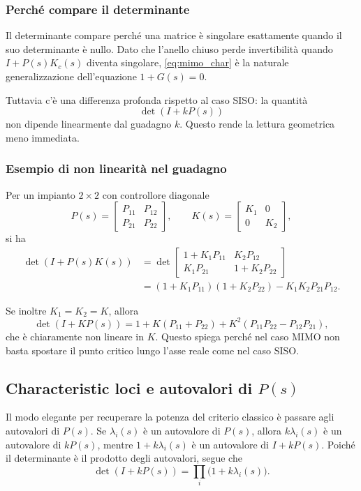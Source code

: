 \documentclass[11pt,a4paper]{article}
\begin{document}
\subsubsection{Perché compare il determinante}

Il determinante compare perché una matrice è singolare esattamente quando il suo determinante è nullo. Dato che l’anello chiuso perde invertibilità quando $I+P(s)K_c(s)$ diventa singolare, \eqref{eq:mimo_char} è la naturale generalizzazione dell’equazione $1+G(s)=0$.

Tuttavia c’è una differenza profonda rispetto al caso SISO: la quantità
$$
\det(I+kP(s))
$$
non dipende linearmente dal guadagno $k$. Questo rende la lettura geometrica meno immediata.

\subsubsection{Esempio di non linearità nel guadagno}

Per un impianto $2\times 2$ con controllore diagonale
$$
P(s)=\begin{bmatrix}P_{11} & P_{12}\\ P_{21} & P_{22}\end{bmatrix},
\qquad
K(s)=\begin{bmatrix}K_1 & 0\\ 0 & K_2\end{bmatrix},
$$
si ha
\begin{align*}
\det(I+P(s)K(s))
&=\det\begin{bmatrix}1+K_1P_{11} & K_2P_{12}\\ K_1P_{21} & 1+K_2P_{22}\end{bmatrix} \\
&=(1+K_1P_{11})(1+K_2P_{22})-K_1K_2P_{21}P_{12}.
\end{align*}

Se inoltre $K_1=K_2=K$, allora
$$
\det(I+KP(s)) = 1 + K(P_{11}+P_{22}) + K^2(P_{11}P_{22}-P_{12}P_{21}),
$$
che è chiaramente non lineare in $K$. Questo spiega perché nel caso MIMO non basta spostare il punto critico lungo l’asse reale come nel caso SISO.

\subsection{Characteristic loci e autovalori di \texorpdfstring{$P(s)$}{P(s)}}

Il modo elegante per recuperare la potenza del criterio classico è passare agli autovalori di $P(s)$. Se $\lambda_i(s)$ è un autovalore di $P(s)$, allora $k\lambda_i(s)$ è un autovalore di $kP(s)$, mentre $1+k\lambda_i(s)$ è un autovalore di $I+kP(s)$. Poiché il determinante è il prodotto degli autovalori, segue che
$$
\det(I+kP(s)) = \prod_i \bigl(1+k\lambda_i(s)\bigr).
\label{eq:det_prod_eigs}
$$
\end{document}
